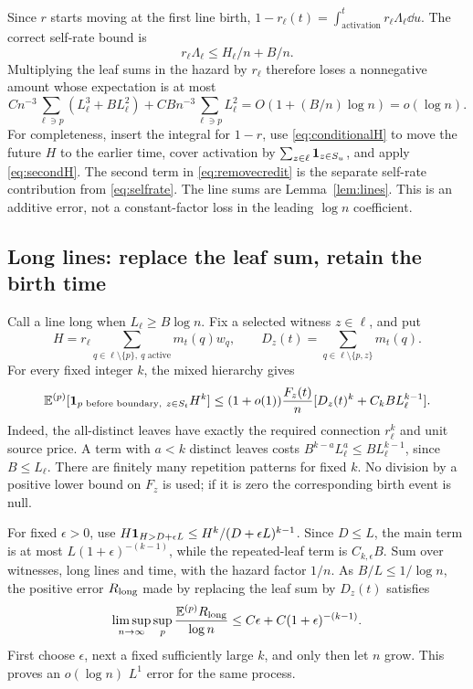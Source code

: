 Since \(r\) starts moving at the first line birth,
\(1-r_\ell(t)=\int_{\text{activation}}^t r_\ell\Lambda_\ell\dd u\).
The correct self-rate bound is
\begin{equation}\label{eq:selfrate}
 r_\ell\Lambda_\ell\le H_\ell/n+B/n.
\end{equation}
Multiplying the leaf sums in the hazard by \(r_\ell\) therefore loses
a nonnegative amount whose expectation is at most
\begin{equation}\label{eq:removecredit}
 Cn^{-3}\sum_{\ell\ni p}(L_\ell^3+BL_\ell^2)
 +CBn^{-3}\sum_{\ell\ni p}L_\ell^2
 =O(1+(B/n)\log n)=o(\log n).
\end{equation}
For completeness, insert the integral for \(1-r\), use
\eqref{eq:conditionalH} to move the future \(H\) to the earlier
time, cover activation by \(\sum_{z\in\ell}\mathbf 1_{z\in S_u}\),
and apply \eqref{eq:secondH}. The second term in
\eqref{eq:removecredit} is the separate self-rate contribution from
\eqref{eq:selfrate}. The line sums are Lemma~\ref{lem:lines}.
This is an additive error, not a constant-factor loss in the leading
\(\log n\) coefficient.

\subsection{Long lines: replace the leaf sum, retain the birth time}
Call a line long when \(L_\ell\ge B\log n\). Fix a selected witness
\(z\in\ell\), and put
\[
 H=r_\ell\sum_{q\in\ell\setminus\{p\},\ q\text{ active}}m_t(q)w_q,
 \qquad D_z(t)=\sum_{q\in\ell\setminus\{p,z\}}m_t(q).
\]
For every fixed integer \(k\), the mixed hierarchy gives
\begin{equation}\label{eq:longmoment}
 \mathbb E^{(p)}[\mathbf 1_{p\text{ before boundary},\ z\in S_t}H^k]
 \le(1+o(1))\frac{F_z(t)}n
       [D_z(t)^k+C_kB L_\ell^{k-1}].
\end{equation}
Indeed, the all-distinct leaves have exactly the required connection
\(r_\ell^k\) and unit source price. A term with \(a<k\) distinct
leaves costs \(B^{k-a}L_\ell^a\le BL_\ell^{k-1}\), since
\(B\le L_\ell\). There are finitely many repetition patterns for
fixed \(k\). No division by a positive lower bound on \(F_z\) is
used; if it is zero the corresponding birth event is null.

For fixed \(\epsilon>0\), use
\(H\mathbf 1_{H>D+\epsilon L}\le H^k/(D+\epsilon L)^{k-1}\).
Since \(D\le L\), the main term is at most
\(L(1+\epsilon)^{-(k-1)}\), while the repeated-leaf term is
\(C_{k,\epsilon}B\). Sum over witnesses, long lines and time,
with the hazard factor \(1/n\). As \(B/L\le1/\log n\), the
positive error \(R_{\rm long}\) made by replacing the leaf sum by
\(D_z(t)\) satisfies
\begin{equation}\label{eq:longerror}
 \limsup_{n\to\infty}\sup_p
 \frac{\mathbb E^{(p)}R_{\rm long}}{\log n}
 \le C\epsilon+C(1+\epsilon)^{-(k-1)}.
\end{equation}
First choose \(\epsilon\), next a fixed sufficiently large \(k\),
and only then let \(n\) grow. This proves an \(o(\log n)\)
\(L^1\) error for the same process.

